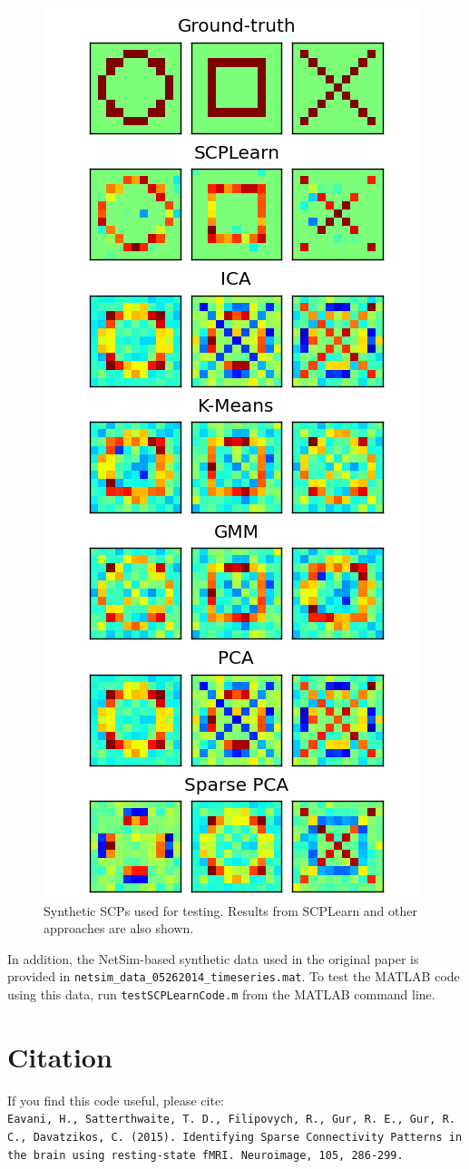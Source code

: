 \documentclass[12pt]{article}
\begin{document}
\begin{figure}
\centering
\includegraphics[scale=0.8]{src/test/Test_2d_all.png}
\caption{Synthetic SCPs used for testing. Results from SCPLearn and other approaches are also shown.}
\label{fig:test}
\end{figure}

In addition, the NetSim-based synthetic data used in the original paper is provided in \texttt{netsim\_data\_05262014\_timeseries.mat}. To test the MATLAB code using this data, run \texttt{testSCPLearnCode.m} from the MATLAB command line.

\section{Citation}
If you find this code useful, please cite: \\
\texttt{Eavani, H., Satterthwaite, T. D., Filipovych, R., Gur, R. E., Gur, R. C.,  Davatzikos, C. (2015). Identifying Sparse Connectivity Patterns in the brain using resting-state fMRI. Neuroimage, 105, 286-299.}
\end{document}
